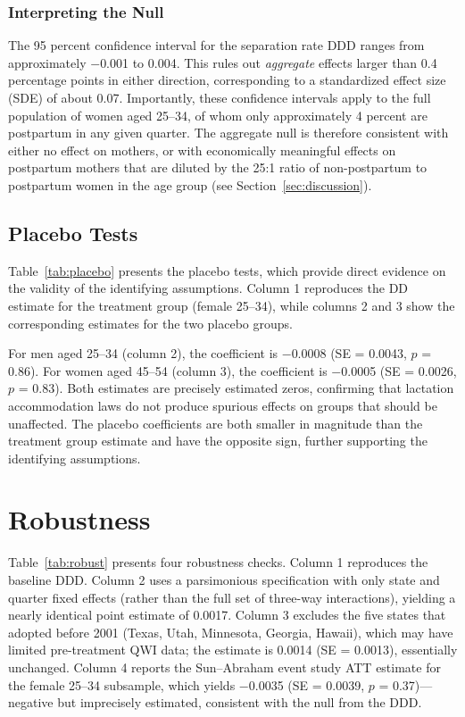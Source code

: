 \documentclass[12pt]{article}
\begin{document}
\subsubsection*{Interpreting the Null} The 95 percent confidence interval for the separation rate DDD ranges from approximately $-$0.001 to 0.004. This rules out \emph{aggregate} effects larger than 0.4 percentage points in either direction, corresponding to a standardized effect size (SDE) of about 0.07. Importantly, these confidence intervals apply to the full population of women aged 25--34, of whom only approximately 4 percent are postpartum in any given quarter. The aggregate null is therefore consistent with either no effect on mothers, or with economically meaningful effects on postpartum mothers that are diluted by the 25:1 ratio of non-postpartum to postpartum women in the age group (see Section~\ref{sec:discussion}).


\subsection{Placebo Tests}



Table~\ref{tab:placebo} presents the placebo tests, which provide direct evidence on the validity of the identifying assumptions. Column 1 reproduces the DD estimate for the treatment group (female 25--34), while columns 2 and 3 show the corresponding estimates for the two placebo groups.

For men aged 25--34 (column 2), the coefficient is $-$0.0008 (SE = 0.0043, $p$ = 0.86). For women aged 45--54 (column 3), the coefficient is $-$0.0005 (SE = 0.0026, $p$ = 0.83). Both estimates are precisely estimated zeros, confirming that lactation accommodation laws do not produce spurious effects on groups that should be unaffected. The placebo coefficients are both smaller in magnitude than the treatment group estimate and have the opposite sign, further supporting the identifying assumptions.


\section{Robustness}
\label{sec:robustness}



Table~\ref{tab:robust} presents four robustness checks. Column 1 reproduces the baseline DDD. Column 2 uses a parsimonious specification with only state and quarter fixed effects (rather than the full set of three-way interactions), yielding a nearly identical point estimate of 0.0017. Column 3 excludes the five states that adopted before 2001 (Texas, Utah, Minnesota, Georgia, Hawaii), which may have limited pre-treatment QWI data; the estimate is 0.0014 (SE = 0.0013), essentially unchanged. Column 4 reports the Sun--Abraham \citep{sunab2021} event study ATT estimate for the female 25--34 subsample, which yields $-$0.0035 (SE = 0.0039, $p$ = 0.37)---negative but imprecisely estimated, consistent with the null from the DDD.
\end{document}
